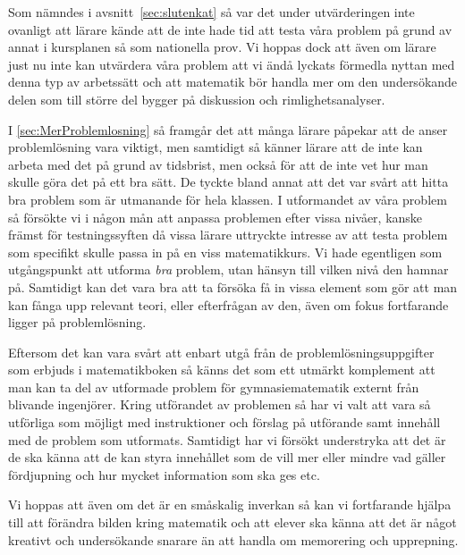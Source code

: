 \textcolor{Mahogany}{
    Som nämndes i avsnitt~\ref{sec:slutenkat} så var det under utvärderingen inte ovanligt att lärare kände att de inte hade tid att testa våra problem på grund av annat i kursplanen så som nationella prov. Vi hoppas dock att även om lärare just nu inte kan utvärdera våra problem att vi ändå lyckats förmedla nyttan med denna typ av arbetssätt och att matematik bör handla mer om den undersökande delen som till större del bygger på diskussion och rimlighetsanalyser.
}

\textcolor{Mahogany}{
    I \ref{sec:MerProblemlosning} så framgår det att många lärare påpekar att de anser problemlösning vara viktigt, men samtidigt så känner lärare att de inte kan arbeta med det på grund av tidsbrist, men också för att de inte vet hur man skulle göra det på ett bra sätt. De tyckte bland annat att det var svårt att hitta bra problem som är utmanande för hela klassen. I utformandet av våra problem så försökte vi i någon mån att anpassa problemen efter vissa nivåer, kanske främst för testningssyften då vissa lärare uttryckte intresse av att testa problem som specifikt skulle passa in på en viss matematikkurs. Vi hade egentligen som utgångspunkt att utforma \textsl{bra} problem, utan hänsyn till vilken nivå den hamnar på. Samtidigt kan det vara bra att ta försöka få in vissa element som gör att man kan fånga upp relevant teori, eller efterfrågan av den, även om fokus fortfarande ligger på problemlösning.
}

\textcolor{Mahogany}{
    Eftersom det kan vara svårt att enbart utgå från de problemlösningsuppgifter som erbjuds i matematikboken så känns det som ett utmärkt komplement att man kan ta del av utformade problem för gymnasiematematik externt från blivande ingenjörer. Kring utförandet av problemen så har vi valt att vara så utförliga som möjligt med instruktioner och förslag på utförande samt innehåll med de problem som utformats. Samtidigt har vi försökt understryka att det är de ska känna att de kan styra innehållet som de vill mer eller mindre vad gäller fördjupning och hur mycket information som ska ges etc.
}

\textcolor{Mahogany}{
    Vi hoppas att även om det är en småskalig inverkan så kan vi fortfarande hjälpa till att förändra bilden kring matematik och att elever ska känna att det är något kreativt och undersökande snarare än att handla om memorering och upprepning.
}